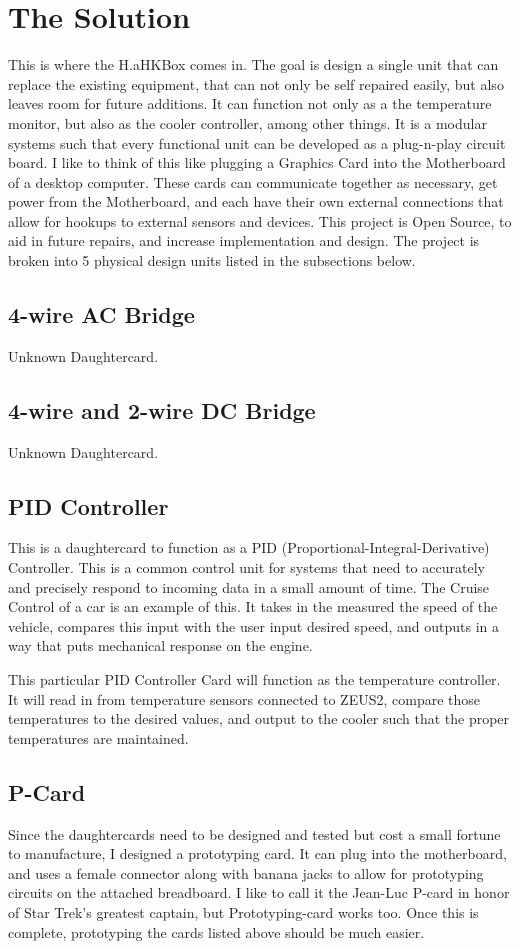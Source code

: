 \documentclass[prb,preprint]{revtex4-1}
\begin{document}
\section{The Solution}
This is where the H.aHKBox comes in. The goal is design a single unit that can replace the existing equipment, that can not only be self repaired easily, but also leaves room for future additions. It can function not only as a the temperature monitor, but also as the cooler controller, among other things. It is a modular systems such that every functional unit can be developed as a plug-n-play circuit board. I like to think of this like plugging a Graphics Card into the Motherboard of a desktop computer. These cards can communicate together as necessary, get power from the Motherboard, and each have their own external connections that allow for hookups to external sensors and devices. This project is Open Source, to aid in future repairs, and increase implementation and design. The project is broken into 5 physical design units listed in the subsections below.

\subsection{4-wire AC Bridge}
Unknown Daughtercard.

\subsection{4-wire and 2-wire DC Bridge}
Unknown Daughtercard.

\subsection{PID Controller}
This is a daughtercard to function as a PID (Proportional-Integral-Derivative) Controller. This is a common control unit for systems that need to accurately and precisely respond to incoming data in a small amount of time. The Cruise Control of a car is an example of this. It takes in the measured the speed of the vehicle, compares this input with the user input desired speed, and outputs in a way that puts mechanical response on the engine.

This particular PID Controller Card will function as the temperature controller. It will read in from temperature sensors connected to ZEUS2, compare those temperatures to the desired values, and output to the cooler such that the proper temperatures are maintained. 

\subsection{P-Card}
Since the daughtercards need to be designed and tested but cost a small fortune to manufacture, I designed a prototyping card. It can plug into the motherboard, and uses a female connector along with banana jacks to allow for prototyping circuits on the attached breadboard. I like to call it the Jean-Luc P-card in honor of Star Trek's greatest captain, but Prototyping-card works too. Once this is complete, prototyping the cards listed above should be much easier.
\end{document}
